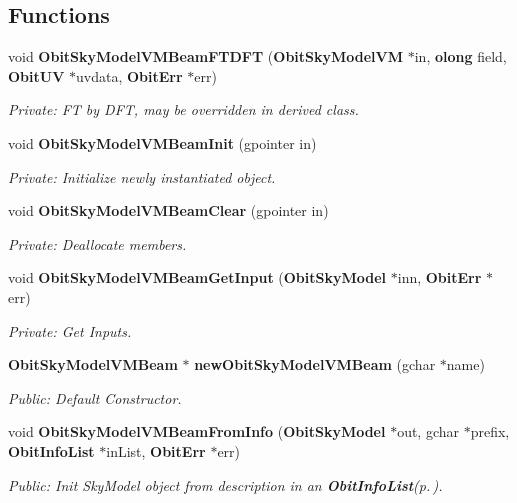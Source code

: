 \subsection*{Functions}
\begin{CompactItemize}
\item 
void {\bf Obit\-Sky\-Model\-VMBeam\-FTDFT} ({\bf Obit\-Sky\-Model\-VM} $\ast$in, {\bf olong} field, {\bf Obit\-UV} $\ast$uvdata, {\bf Obit\-Err} $\ast$err)
\begin{CompactList}\small\item\em Private: FT by DFT, may be overridden in derived class. \item\end{CompactList}\item 
void {\bf Obit\-Sky\-Model\-VMBeam\-Init} (gpointer in)
\begin{CompactList}\small\item\em Private: Initialize newly instantiated object. \item\end{CompactList}\item 
void {\bf Obit\-Sky\-Model\-VMBeam\-Clear} (gpointer in)
\begin{CompactList}\small\item\em Private: Deallocate members. \item\end{CompactList}\item 
void {\bf Obit\-Sky\-Model\-VMBeam\-Get\-Input} ({\bf Obit\-Sky\-Model} $\ast$inn, {\bf Obit\-Err} $\ast$err)
\begin{CompactList}\small\item\em Private: Get Inputs. \item\end{CompactList}\item 
{\bf Obit\-Sky\-Model\-VMBeam} $\ast$ {\bf new\-Obit\-Sky\-Model\-VMBeam} (gchar $\ast$name)
\begin{CompactList}\small\item\em Public: Default Constructor. \item\end{CompactList}\item 
void {\bf Obit\-Sky\-Model\-VMBeam\-From\-Info} ({\bf Obit\-Sky\-Model} $\ast$out, gchar $\ast$prefix, {\bf Obit\-Info\-List} $\ast$in\-List, {\bf Obit\-Err} $\ast$err)
\begin{CompactList}\small\item\em Public: Init Sky\-Model object from description in an {\bf Obit\-Info\-List}{\rm (p.\,\pageref{structObitInfoList})}. \item\end{CompactList}\item 

\end{CompactItemize}

